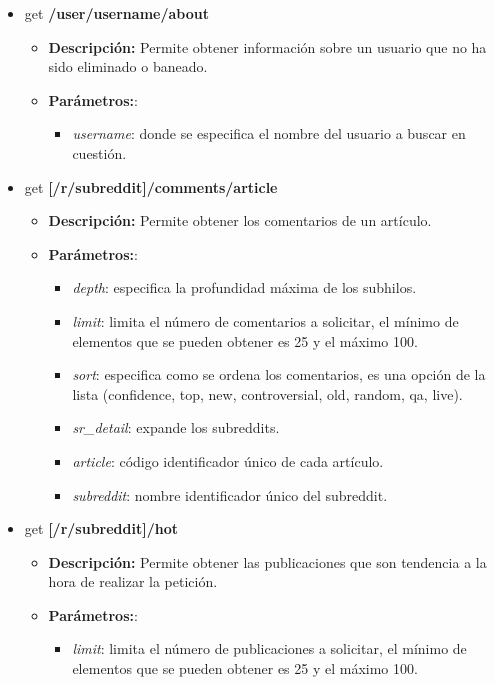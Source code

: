 \documentclass[../../main.tex]{subfiles}
\begin{document}
\begin{itemize}

    \item \gls{get} \textbf{/user/username/about}
    \begin{itemize}
        \item \textbf{Descripción:} Permite obtener información sobre un usuario que no ha sido eliminado o baneado.
        \item \textbf{Parámetros:}:
        \begin{itemize}
            \item  \textit{username}: donde se especifica el nombre del usuario a buscar en cuestión.
        \end{itemize}
    \end{itemize}
    
    \item \gls{get} \textbf{[/r/subreddit]/comments/article}
    \begin{itemize}
        \item \textbf{Descripción:} Permite obtener los comentarios de un artículo.
        \item \textbf{Parámetros:}:
        \begin{itemize}
            \item  \textit{depth}: especifica la profundidad máxima de los subhilos.
            
            \item  \textit{limit}: limita el número de comentarios a solicitar, el mínimo de elementos que se pueden obtener es 25 y el máximo 100.
            
            \item  \textit{sort}: especifica como se ordena los comentarios, es una opción de la lista (confidence, top, new, controversial, old, random, qa, live).
            
            \item  \textit{sr\_detail}: expande los \glspl{subreddit}.
            
            \item  \textit{article}: código identificador único de cada artículo.
            
            \item  \textit{subreddit}: nombre identificador único del \gls{subreddit}.
        \end{itemize}
    \end{itemize}
    
    \item \gls{get} \textbf{[/r/subreddit]/hot}
    \begin{itemize}
        \item \textbf{Descripción:} Permite obtener las publicaciones que son tendencia a la hora de realizar la petición.
        \item \textbf{Parámetros:}:
        \begin{itemize}
            \item  \textit{limit}: limita el número de publicaciones a solicitar, el mínimo de elementos que se pueden obtener es 25 y el máximo 100.
            

\end{itemize}
\end{itemize}
\end{itemize}
\end{document}
